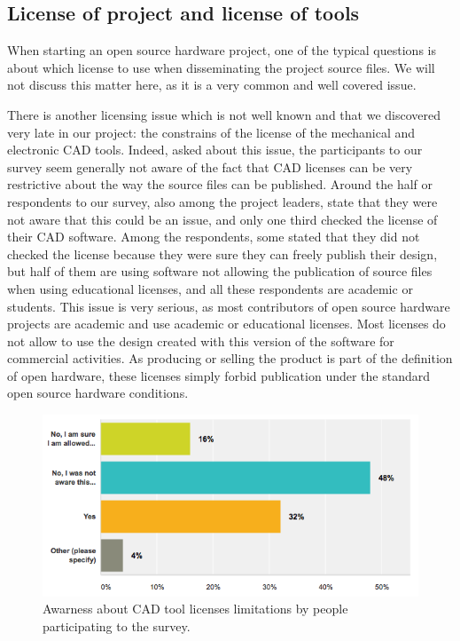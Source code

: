 \documentclass[letterpaper, 10 pt, conference]{ieeeconf}  %
\begin{document}
\subsection{License of project and license of tools}

When starting an open source hardware project, one of the typical questions is about which license to use when disseminating the project source files. 
We will not discuss this matter here, as it is a very common and well covered issue. 

There is another licensing issue which is not well known and that we discovered very late in our project: the constrains of the license of the mechanical and electronic CAD tools. 
Indeed, asked about this issue, the participants to our survey seem generally not aware of the fact that CAD licenses can be very restrictive about the way the source files can be published.
Around the half or respondents to our survey, also among the project leaders, state that they were not aware that this could be an issue, and only one third checked the license of their CAD software. 
Among the respondents, some stated that they did not checked the license because they were sure they can freely publish their design, but half of them are using software not allowing the publication of source files when using educational licenses, and all these respondents are academic or students.
This issue is very serious, as most contributors of open source hardware projects are academic and use academic or educational licenses. 
Most licenses do not allow to use the design created with this version of the software for commercial activities. 
As producing or selling the product is part of the definition of open hardware, these licenses simply forbid publication under the standard open source hardware conditions. 

\begin{figure}
\centering
\includegraphics[width=.9\columnwidth]{figures/aware-license}
\caption{Awarness about CAD tool licenses limitations by people participating to the survey.}
\label{fig:aware}
\end{figure}
\end{document}

